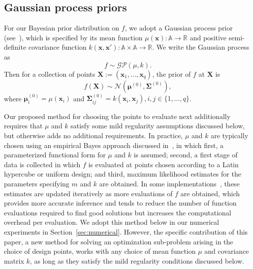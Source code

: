 \documentclass[paper=letter]{scrartcl}
\newcommand{\bx}{\bm{x}}
\newcommand{\bmu}[1]{\bm{\mu}^{(#1)}}
\newcommand{\Sig}[1]{\bm{\Sigma}^{(#1)}} %
\begin{document}
\subsection{Gaussian process priors}    \label{sec:gp_model}
For our Bayesian prior distribution on $f$, we adopt a Gaussian process prior (see~\citealt{RaWi06}), 
which is specified by its mean function $\mu(\bm{x}) : \mathbb A \rightarrow \mathbb{R}$ 
and positive semi-definite covariance function $k(\bm{x}, \bm{x}') : \mathbb A \times \mathbb A \rightarrow \mathbb{R}$. 
We write the Gaussian process as 
\begin{equation*}
  f \sim \mathcal{GP}(\mu, k).
\end{equation*}
Then for a collection of points $\bm{X} := (\bx_1,\ldots,\bx_q)$, the prior of $f$ at 
$\bm{X}$ is
\begin{equation}
  f(\bm{X}) \sim \mathcal{N} (\bmu{0}, \Sig{0}),
  \label{eq:prior}
\end{equation}
where $\bmu{0}_i = \mu(\bx_i)$ and $\Sig{0}_{ij} = k(\bx_i, \bx_j), i,j \in \{1,\ldots, q\}$. 

Our proposed method for choosing the points to evaluate next additionally requires
that $\mu$ and $k$ satisfy some mild regularity assumptions discussed below, but otherwise
adds no additional requirements.
In practice, $\mu$ and $k$ are
typically chosen using an empirical Bayes approach discussed in~\cite{brochu2010bayesian}, in which
first, a parameterized functional form for $\mu$ and $k$ is assumed; 
second, a first stage of data is collected in which $f$ is evaluated at points chosen 
according to a Latin hypercube or uniform design; 
and third, maximum likelihood estimates for the parameters specifying $m$ and $k$ are obtained.  
In some implementations~\citep{JoScWe98, snoek2012practical}, these estimates are updated iteratively as more evaluations of
$f$ are obtained, which provides more accurate inference and tends to reduce the number of function evaluations required to find good solutions but increases the computational overhead per evaluation.
We adopt this method below in our numerical experiments in
Section~\ref{sec:numerical}.
However, the specific contribution of this paper, a new method for solving an
optimization sub-problem arising in the choice of design points, works with any
choice of mean function $\mu$ and covariance matrix $k$, as long as they satisfy
the mild regularity conditions discussed below.

%
\end{document}
